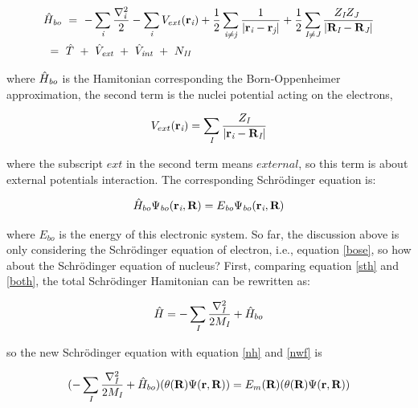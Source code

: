 \documentclass[a4paper, 12pt, titlepage,oneside,drop]{kthesis}
\begin{document}
\begin{equation}\label{both}\begin{split}
&{\hath}_\textit{bo}\ =\ - \sumi<i>   \frac{{{\nabla}_{\textit{i}}^{2}}}{2}  - \sumi<i> V_{ext}(\textbf{r}_{\textit{i}})  + \frac{1}{2} \suminj<i><j> \frac{1}{ |\textbf{r}_\textit{i}-\textbf{r}_\textit{j}|} + \frac{1}{2} \suminj<I><J> \frac{Z_\textit{I} Z_\textit{J}\ }{|\textbf{R}_\textit{I}-\textbf{R}_\textit{J}|} \\
&\ = \ \hat{T} \ + \ \hat{V}_\textit{ext} \ + \ \hat{V}_\textit{int}\ + \ N_\textit{II}
\end{split}\end{equation}

\noindent where ${\hat{H}}_\textit{bo}$  is the Hamitonian corresponding the Born-Oppenheimer approximation, the second term is the nuclei potential acting on the
electrons, 

\begin{equation}
V_{ext}(\textbf{r}_{\textit{i}}) =  \sumi<I> \frac{Z_\textit{I}}{|\textbf{r}_\textit{i}-\textbf{R}_\textit{I}|}
\end{equation}

\noindent where the subscript $ext$ in the second term means $external$, so this term is about external potentials interaction. 
The corresponding Schrödinger equation is:

\begin{equation}\label{bose}
{\hat{H}}_{bo} \Psi_{{\textit bo}}({{\textbf r}_{{\textit i}}},{\textbf R} ) = E_\textit{bo} {\Psi_{{\textit bo}}({{\textbf r}_{{\textit i}}},{\textbf R} )}
\end{equation}

\noindent where $E_\textit{bo}$ is the energy of this electronic system. So far,
the discussion above is only considering the Schrödinger equation of electron, i.e., equation \ref{bose}, so how about the Schrödinger equation of nucleus? First, comparing equation
\ref{sth} and \ref{both}, the total Schrödinger Hamitonian can be rewritten as: 

\begin{equation}\label{nh}
 {\hath} = - \sumi<I> \frac{{{\nabla}_{\textit{I}}^{2}}}{2 M_\textit{I}} + {\hath}_{bo}
\end{equation}

\noindent so the new Schrödinger equation with equation \ref{nh} and \ref{nwf} is 

\begin{equation}
 (- \sumi<I> \frac{{{\nabla}_{\textit{I}}^{2}}}{2 M_\textit{I}} + {\hath}_{bo} ) ( {\theta(\textbf{R})} {\Psi(\textbf{r}, \textbf{R})}) = E_{m}({\textbf R}) ({\theta(\textbf{R})} {\Psi(\textbf{r}, \textbf{R})} )
\end{equation}
 
\end{document}
